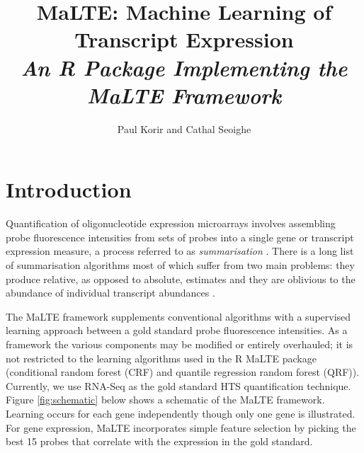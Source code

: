 \documentclass[a4paper,12pt]{article}
\author{Paul Korir and Cathal Seoighe}
\title{\textbf{MaLTE: Machine Learning of Transcript Expression}\\\textit{An \textsf{R} Package Implementing the MaLTE Framework}}
\date{}
\begin{document}
\maketitle

\tableofcontents

\newpage


\section{Introduction}
\label{introduction}
Quantification of oligonucleotide expression microarrays involves assembling probe fluorescence intensities from sets of probes into a single gene or transcript expression measure, a process referred to as \textit{summarisation} \cite{irizarry2003summaries}. There is a long list of summarisation algorithms \cite{irizarry2006comparison} most of which suffer from two main problems: they produce relative, as opposed to absolute, estimates \cite{irizarry2005multiple, fu2009estimating} and they are oblivious to the abundance of individual transcript abundances \cite{malone2011microarrays}. 

The \textsf{MaLTE} framework supplements conventional algorithms with a supervised learning approach between a gold standard probe fluorescence intensities. As a framework the various components may be modified or entirely overhauled; it is not restricted to the learning algorithms used in the \textsf{R} \textsf{MaLTE} package (conditional random forest (CRF) and quantile regression random forest (QRF)). Currently, we use RNA-Seq as the gold standard HTS quantification technique. Figure \ref{fig:schematic} below shows a schematic of the \textsf{MaLTE} framework. Learning occurs for each gene independently though only one gene is illustrated. For gene expression, \textsf{MaLTE} incorporates simple feature selection by picking the best 15 probes that correlate with the expression in the gold standard.
\end{document}
